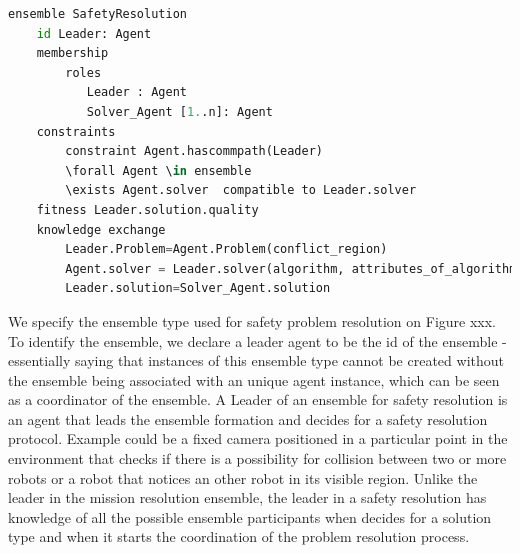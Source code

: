\documentclass[journal]{IEEEtran}
\theoremstyle{definition}
\begin{document}
\begin{lstlisting}[caption=EDL Specification for safety resolution ensembles, language=Python]
ensemble SafetyResolution
    id Leader: Agent
    membership
        roles
           Leader : Agent
           Solver_Agent [1..n]: Agent
    constraints
        constraint Agent.hascommpath(Leader)
        \forall Agent \in ensemble
        \exists Agent.solver  compatible to Leader.solver
    fitness Leader.solution.quality
    knowledge exchange
        Leader.Problem=Agent.Problem(conflict_region)
        Agent.solver = Leader.solver(algorithm, attributes_of_algorithm)
        Leader.solution=Solver_Agent.solution
\end{lstlisting}

We  specify the ensemble  type  used  for  safety  problem resolution on Figure xxx. To identify the ensemble, we declare a leader  agent  to  be  the  id  of  the  ensemble - essentially saying that instances of this ensemble type cannot be created without the ensemble being associated with an unique agent instance, which can be seen as a coordinator of the ensemble. 
A Leader of an ensemble for safety resolution is an agent that leads the ensemble formation and decides for a safety resolution protocol.
Example could be a fixed camera positioned in a particular point in the environment that checks if there is a possibility for collision between two or more robots or a robot that notices an other robot in its visible region. Unlike the leader in the mission resolution ensemble, the leader in a safety resolution has knowledge of all the possible ensemble participants when decides for a solution type and when it starts the coordination of the problem resolution process.
\end{document}
